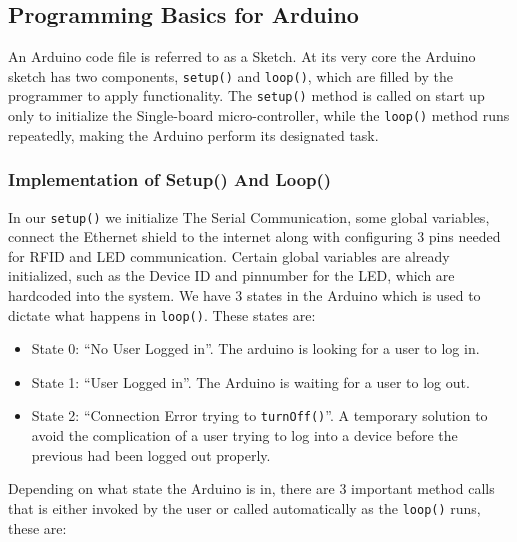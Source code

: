 \subsection{Programming Basics for Arduino}

An Arduino code file is referred to as a Sketch. At its very core the Arduino sketch has two components, \verb|setup()| and \verb|loop()|, which are filled by the programmer to apply functionality.
The \verb|setup()| method is called on start up only to initialize the Single-board micro-controller, while the \verb|loop()| method runs repeatedly, making the Arduino perform its designated task.

\subsubsection*{Implementation of Setup() And Loop()}
In our \verb|setup()| we initialize The Serial Communication, some global variables, connect the Ethernet shield to the internet along with configuring 3 pins needed for RFID and LED communication. Certain global variables are already initialized, such as the Device ID and pinnumber for the LED, which are hardcoded into the system.\newline
We have 3 states in the Arduino which is used to dictate what happens in \verb|loop()|. These states are:
\begin{itemize}
	\item State 0: ``No User Logged in''. The arduino is looking for a user to log in.
	\item State 1: ``User Logged in''. The Arduino is waiting for a user to log out.
	\item State 2: ``Connection Error trying to \verb|turnOff()|''. A temporary solution to avoid the complication of a user trying to log into a device before the previous had been logged out properly.
\end{itemize}
Depending on what state the Arduino is in, there are 3 important method calls that is either invoked by the user or called automatically as the \verb|loop()| runs, these are:

